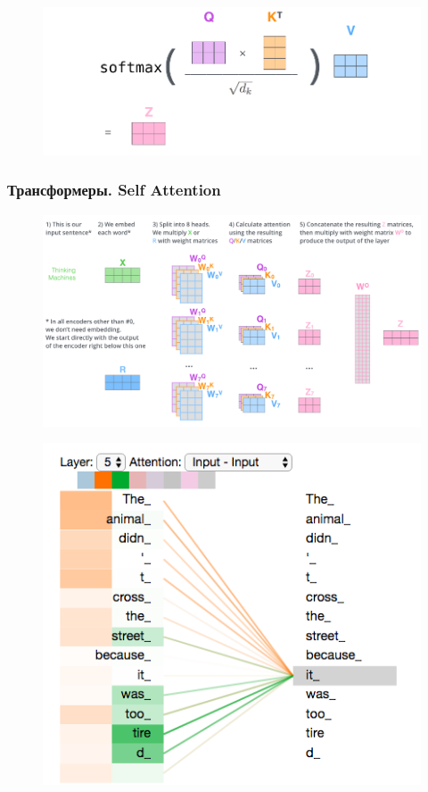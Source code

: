 \documentclass[notheorems, handout]{beamer}
\begin{document}
\begin{frame}
\begin{figure}[H]
			\begin{center}
				\includegraphics[scale=0.2]{img/self-attention2.png}
			\end{center}
		\end{figure}
	\end{frame}
	
	\begin{frame}
	\frametitle{Трансформеры. Self Attention}
		\begin{figure}[H]
			\begin{center}
				\includegraphics[scale=0.15]{img/att-all.png}
			\end{center}
		\end{figure}
		\begin{figure}[H]
			\begin{center}
				\includegraphics[scale=0.2]{img/att-ex.png}
			\end{center}
		\end{figure}
	\end{frame}
	
\end{document}
